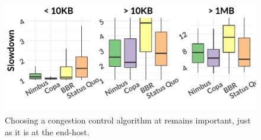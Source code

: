 \begin{figure}
    \centering
\begin{knitrout}
\color{fgcolor}
\includegraphics[width=\maxwidth]{figure/eval:cc-1} 

\end{knitrout}
    \caption{Choosing a congestion control algorithm at \name remains important, just as it is at the end-host.}
    \label{fig:eval:cc}
\end{figure}
